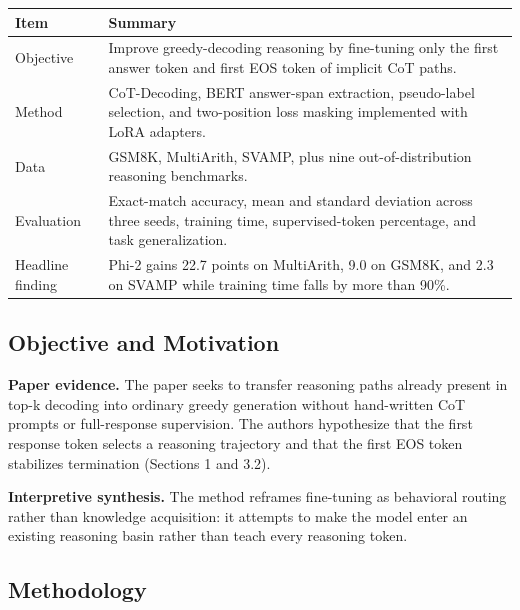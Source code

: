 \documentclass[11pt]{article}
\newcounter{none} %
\begin{document}
{\def\LTcaptype{none} %
\begin{longtable}[]{@{}
  >{\raggedright\arraybackslash}p{}
  >{\raggedright\arraybackslash}p{}@{}}
\toprule\noalign{}
\begin{minipage}[b]{\linewidth}\centering
\textbf{Item}
\end{minipage} & \begin{minipage}[b]{\linewidth}\centering
\textbf{Summary}
\end{minipage} \\
\midrule\noalign{}
\endhead
\bottomrule\noalign{}
\endlastfoot
Objective & Improve greedy-decoding reasoning by fine-tuning only the
first answer token and first EOS token of implicit CoT paths. \\
Method & CoT-Decoding, BERT answer-span extraction, pseudo-label
selection, and two-position loss masking implemented with LoRA
adapters. \\
Data & GSM8K, MultiArith, SVAMP, plus nine out-of-distribution reasoning
benchmarks. \\
Evaluation & Exact-match accuracy, mean and standard deviation across
three seeds, training time, supervised-token percentage, and task
generalization. \\
Headline finding & Phi-2 gains 22.7 points on MultiArith, 9.0 on GSM8K,
and 2.3 on SVAMP while training time falls by more than 90\%. \\
\end{longtable}
}

\subsection{Objective and Motivation}\label{objective-and-motivation}

\textbf{Paper evidence.} The paper seeks to transfer reasoning paths already present in
top-k decoding into ordinary greedy generation without hand-written CoT
prompts or full-response supervision. The authors hypothesize that the
first response token selects a reasoning trajectory and that the first
EOS token stabilizes termination (Sections 1 and 3.2).

\textbf{Interpretive synthesis.} The method reframes fine-tuning as behavioral routing
rather than knowledge acquisition: it attempts to make the model enter
an existing reasoning basin rather than teach every reasoning token.

\subsection{Methodology}\label{methodology-1}
\end{document}
